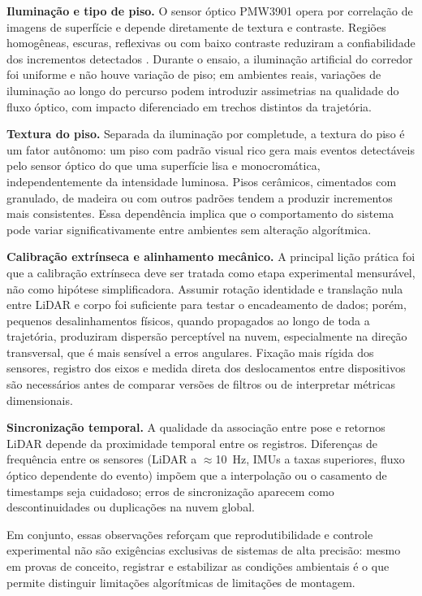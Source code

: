 \textbf{Iluminação e tipo de piso.} O sensor óptico PMW3901 opera por
correlação de imagens de superfície e depende diretamente de textura e
contraste. Regiões homogêneas, escuras, reflexivas ou com baixo contraste
reduziram a confiabilidade dos incrementos detectados
\parencite{lucasKanade1981,pixart2017pmw3901}. Durante o ensaio, a
iluminação artificial do corredor foi uniforme e não houve variação de piso;
em ambientes reais, variações de iluminação ao longo do percurso podem
introduzir assimetrias na qualidade do fluxo óptico, com impacto
diferenciado em trechos distintos da trajetória.

\textbf{Textura do piso.} Separada da iluminação por completude, a textura
do piso é um fator autônomo: um piso com padrão visual rico gera mais eventos
detectáveis pelo sensor óptico do que uma superfície lisa e monocromática,
independentemente da intensidade luminosa. Pisos cerâmicos, cimentados com
granulado, de madeira ou com outros padrões tendem a produzir incrementos mais
consistentes. Essa dependência implica que o comportamento do sistema pode
variar significativamente entre ambientes sem alteração algorítmica.

\textbf{Calibração extrínseca e alinhamento mecânico.} A principal lição
prática foi que a calibração extrínseca deve ser tratada como etapa
experimental mensurável, não como hipótese simplificadora. Assumir rotação
identidade e translação nula entre LiDAR e corpo foi suficiente para testar o
encadeamento de dados; porém, pequenos desalinhamentos físicos, quando
propagados ao longo de toda a trajetória, produziram dispersão perceptível na
nuvem, especialmente na direção transversal, que é mais sensível a erros
angulares. Fixação mais rígida dos sensores, registro dos eixos e medida
direta dos deslocamentos entre dispositivos são necessários antes de comparar
versões de filtros ou de interpretar métricas dimensionais.

\textbf{Sincronização temporal.} A qualidade da associação entre pose e
retornos LiDAR depende da proximidade temporal entre os registros. Diferenças
de frequência entre os sensores (LiDAR a \(\approx\)10~Hz, IMUs a taxas
superiores, fluxo óptico dependente do evento) impõem que a interpolação ou
o casamento de timestamps seja cuidadoso; erros de sincronização aparecem como
descontinuidades ou duplicações na nuvem global.

Em conjunto, essas observações reforçam que reprodutibilidade e controle
experimental não são exigências exclusivas de sistemas de alta precisão: mesmo
em provas de conceito, registrar e estabilizar as condições ambientais é o que
permite distinguir limitações algorítmicas de limitações de montagem.


